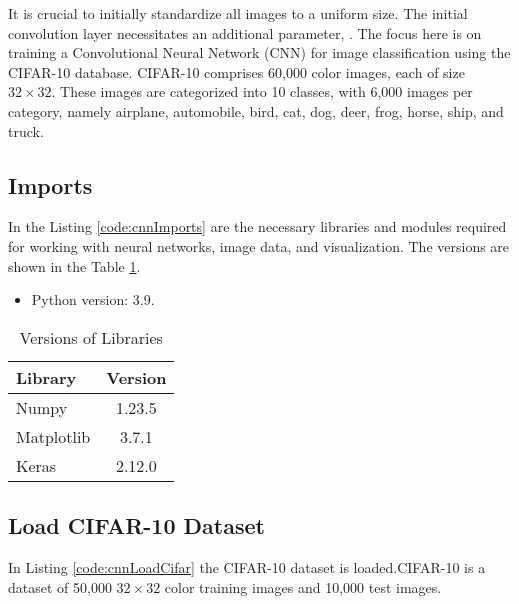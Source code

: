 It is crucial to initially standardize all images to a uniform size. The initial convolution layer necessitates an additional parameter, . The focus here is on training a Convolutional Neural Network (CNN) for image classification using the CIFAR-10 database. CIFAR-10 comprises 60,000 color images, each of size $32 \times 32$. These images are categorized into 10 classes, with 6,000 images per category, namely airplane, automobile, bird, cat, dog, deer, frog, horse, ship, and truck.

\subsection{Imports}

In the Listing \ref{code:cnnImports} are the necessary libraries and modules required for working with neural networks, image data, and visualization. The versions are shown in the Table \ref{tab:cnnlibraryVersions}.

\begin{itemize}
	\item Python version: 3.9.
\end{itemize}

\begin{table}[htbp]
	\centering
	\caption{Versions of Libraries}
	\label{tab:cnnlibraryVersions}
	\begin{tabular}{|l|c|}
		\hline
		\textbf{Library} & \textbf{Version} \\
		\hline
		Numpy & 1.23.5 \\
		Matplotlib & 3.7.1 \\
		Keras & 2.12.0 \\
		\hline
	\end{tabular}
\end{table}

\begin{code}[h!]
	    
	\caption{Importing necessary libraries and modules.}
	\label{code:cnnImports}
\end{code}


\subsection{Load CIFAR-10 Dataset}

In Listing \ref{code:cnnLoadCifar} the CIFAR-10 dataset is loaded.CIFAR-10 is a dataset of 50,000 $32 \times 32$ color training images and 10,000 test images.

